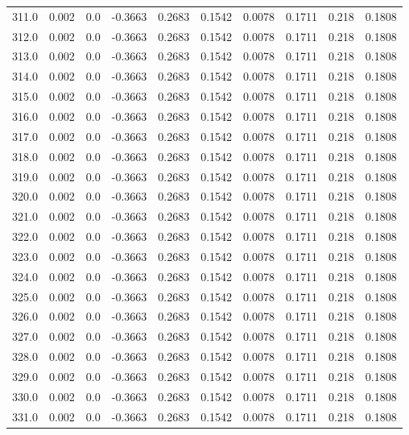 \begin{longtable}{lrrrrrrrrr}
311.0 & 0.002 & 0.0 & -0.3663 & 0.2683 & 0.1542 & 0.0078 & 0.1711 & 0.218 & 0.1808 \\
312.0 & 0.002 & 0.0 & -0.3663 & 0.2683 & 0.1542 & 0.0078 & 0.1711 & 0.218 & 0.1808 \\
313.0 & 0.002 & 0.0 & -0.3663 & 0.2683 & 0.1542 & 0.0078 & 0.1711 & 0.218 & 0.1808 \\
314.0 & 0.002 & 0.0 & -0.3663 & 0.2683 & 0.1542 & 0.0078 & 0.1711 & 0.218 & 0.1808 \\
315.0 & 0.002 & 0.0 & -0.3663 & 0.2683 & 0.1542 & 0.0078 & 0.1711 & 0.218 & 0.1808 \\
316.0 & 0.002 & 0.0 & -0.3663 & 0.2683 & 0.1542 & 0.0078 & 0.1711 & 0.218 & 0.1808 \\
317.0 & 0.002 & 0.0 & -0.3663 & 0.2683 & 0.1542 & 0.0078 & 0.1711 & 0.218 & 0.1808 \\
318.0 & 0.002 & 0.0 & -0.3663 & 0.2683 & 0.1542 & 0.0078 & 0.1711 & 0.218 & 0.1808 \\
319.0 & 0.002 & 0.0 & -0.3663 & 0.2683 & 0.1542 & 0.0078 & 0.1711 & 0.218 & 0.1808 \\
320.0 & 0.002 & 0.0 & -0.3663 & 0.2683 & 0.1542 & 0.0078 & 0.1711 & 0.218 & 0.1808 \\
321.0 & 0.002 & 0.0 & -0.3663 & 0.2683 & 0.1542 & 0.0078 & 0.1711 & 0.218 & 0.1808 \\
322.0 & 0.002 & 0.0 & -0.3663 & 0.2683 & 0.1542 & 0.0078 & 0.1711 & 0.218 & 0.1808 \\
323.0 & 0.002 & 0.0 & -0.3663 & 0.2683 & 0.1542 & 0.0078 & 0.1711 & 0.218 & 0.1808 \\
324.0 & 0.002 & 0.0 & -0.3663 & 0.2683 & 0.1542 & 0.0078 & 0.1711 & 0.218 & 0.1808 \\
325.0 & 0.002 & 0.0 & -0.3663 & 0.2683 & 0.1542 & 0.0078 & 0.1711 & 0.218 & 0.1808 \\
326.0 & 0.002 & 0.0 & -0.3663 & 0.2683 & 0.1542 & 0.0078 & 0.1711 & 0.218 & 0.1808 \\
327.0 & 0.002 & 0.0 & -0.3663 & 0.2683 & 0.1542 & 0.0078 & 0.1711 & 0.218 & 0.1808 \\
328.0 & 0.002 & 0.0 & -0.3663 & 0.2683 & 0.1542 & 0.0078 & 0.1711 & 0.218 & 0.1808 \\
329.0 & 0.002 & 0.0 & -0.3663 & 0.2683 & 0.1542 & 0.0078 & 0.1711 & 0.218 & 0.1808 \\
330.0 & 0.002 & 0.0 & -0.3663 & 0.2683 & 0.1542 & 0.0078 & 0.1711 & 0.218 & 0.1808 \\
331.0 & 0.002 & 0.0 & -0.3663 & 0.2683 & 0.1542 & 0.0078 & 0.1711 & 0.218 & 0.1808 \\

\end{longtable}
